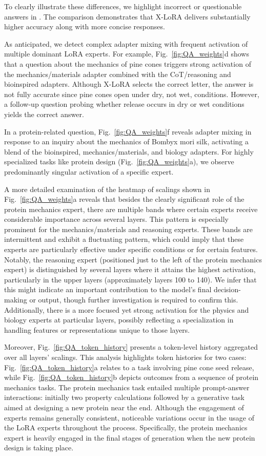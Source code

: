 To clearly illustrate these differences, we highlight incorrect or questionable answers in . The comparison demonstrates that X-LoRA delivers substantially higher accuracy along with more concise responses.

As anticipated, we detect complex adapter mixing with frequent activation of multiple dominant LoRA experts. For example, Fig.~\ref{fig:QA_weights}d shows that a question about the mechanics of pine cones triggers strong activation of the mechanics/materials adapter combined with the CoT/reasoning and bioinspired adapters. Although X-LoRA selects the correct letter, the answer is not fully accurate since pine cones open under dry, not wet, conditions. However, a follow-up question probing whether release occurs in dry or wet conditions yields the correct answer.

In a protein-related question, Fig.~\ref{fig:QA_weights}f reveals adapter mixing in response to an inquiry about the mechanics of Bombyx mori silk, activating a blend of the bioinspired, mechanics/materials, and biology adapters. For highly specialized tasks like protein design (Fig.~\ref{fig:QA_weights}a), we observe predominantly singular activation of a specific expert.

A more detailed examination of the heatmap of scalings shown in Fig.~\ref{fig:QA_weights}a reveals that besides the clearly significant role of the protein mechanics expert, there are multiple bands where certain experts receive considerable importance across several layers. This pattern is especially prominent for the mechanics/materials and reasoning experts. These bands are intermittent and exhibit a fluctuating pattern, which could imply that these experts are particularly effective under specific conditions or for certain features. Notably, the reasoning expert (positioned just to the left of the protein mechanics expert) is distinguished by several layers where it attains the highest activation, particularly in the upper layers (approximately layers 100 to 140). We infer that this might indicate an important contribution to the model’s final decision-making or output, though further investigation is required to confirm this. Additionally, there is a more focused yet strong activation for the physics and biology experts at particular layers, possibly reflecting a specialization in handling features or representations unique to those layers.

Moreover, Fig.~\ref{fig:QA_token_history} presents a token-level history aggregated over all layers’ scalings. This analysis highlights token histories for two cases: Fig.~\ref{fig:QA_token_history}a relates to a task involving pine cone seed release, while Fig.~\ref{fig:QA_token_history}b depicts outcomes from a sequence of protein mechanics tasks. The protein mechanics task entailed multiple prompt-answer interactions: initially two property calculations followed by a generative task aimed at designing a new protein near the end. Although the engagement of experts remains generally consistent, noticeable variations occur in the usage of the LoRA experts throughout the process. Specifically, the protein mechanics expert is heavily engaged in the final stages of generation when the new protein design is taking place.

